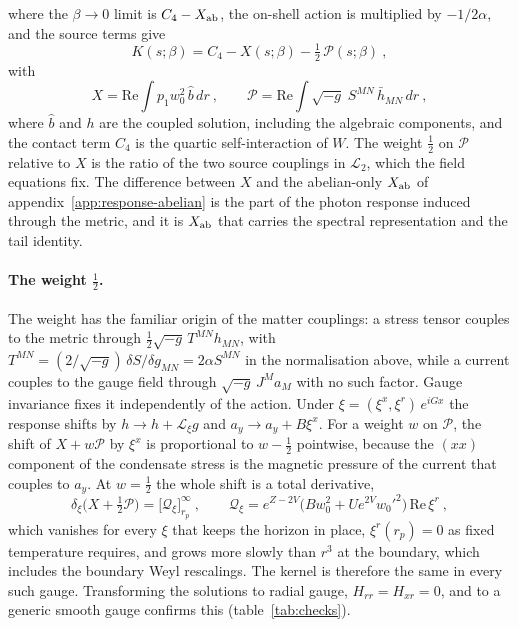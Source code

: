 where the $\beta \to 0$ limit is $C_4 - X_{\rm ab}$, the on-shell action is
multiplied by $-1/2\alpha$, and the source terms give
\begin{equation}
K(s;\beta) = C_4 - X(s;\beta) - \tfrac12\,\mathcal{P}(s;\beta)~,
\end{equation}
with
\begin{equation}
X = \mathrm{Re}\!\int p_1w_0^2\,\hat b\,dr~, \qquad
\mathcal{P} = \mathrm{Re}\!\int\sqrt{-g}\;S^{MN}\,\bar h_{MN}\,dr~,
\end{equation}
where $\hat b$ and $h$ are the coupled solution, including the algebraic
components, and the contact term $C_4$ is the quartic self-interaction of
$W$. The weight $\tfrac12$ on $\mathcal{P}$ relative to $X$ is the
ratio of the two source couplings in $\mathcal{L}_2$, which the field
equations fix. The difference between $X$ and the abelian-only $X_{\rm ab}$
of appendix~\ref{app:response-abelian} is the part of the photon response
induced through the metric, and it is $X_{\rm ab}$ that carries the spectral
representation and the tail identity.

\paragraph{The weight $\tfrac12$.} The weight has the familiar origin of
the matter couplings: a stress tensor couples to the metric through
$\tfrac12\sqrt{-g}\,T^{MN}h_{MN}$, with
$T^{MN} = (2/\sqrt{-g})\,\delta S/\delta g_{MN} = 2\alpha S^{MN}$ in the
normalisation above, while a current couples to the gauge field through
$\sqrt{-g}\,J^Ma_M$ with no such factor. Gauge invariance fixes it
independently of the action. Under $\xi = (\xi^x, \xi^r)\,e^{iGx}$ the response
shifts by $h \to h + \mathcal{L}_\xi g$ and $a_y \to a_y + B\xi^x$. For a
weight $w$ on $\mathcal{P}$, the shift of $X + w\mathcal{P}$ by $\xi^x$ is
proportional to $w - \tfrac12$ pointwise, because the $(xx)$ component of
the condensate stress is the magnetic pressure of the current that couples
to $a_y$. At $w = \tfrac12$ the whole shift is a total derivative,
\begin{equation}
\delta_\xi\Big(X + \tfrac12\mathcal{P}\Big) = \Big[\mathcal{Q}_\xi\Big]_{r_p}^{\infty}~, \qquad
\mathcal{Q}_\xi = e^{Z-2V}\big(Bw_0^2 + Ue^{2V}w_0'^2\big)\,\mathrm{Re}\,\xi^r~,
\end{equation}
which vanishes for every $\xi$ that keeps the horizon in place,
$\xi^r(r_p) = 0$ as fixed temperature requires, and grows more slowly than
$r^3$ at the boundary, which includes the boundary Weyl rescalings. The
kernel is therefore the same in every such gauge. Transforming the solutions to
radial gauge, $H_{rr} = H_{xr} = 0$, and to a generic smooth gauge confirms
this (table~\ref{tab:checks}).

